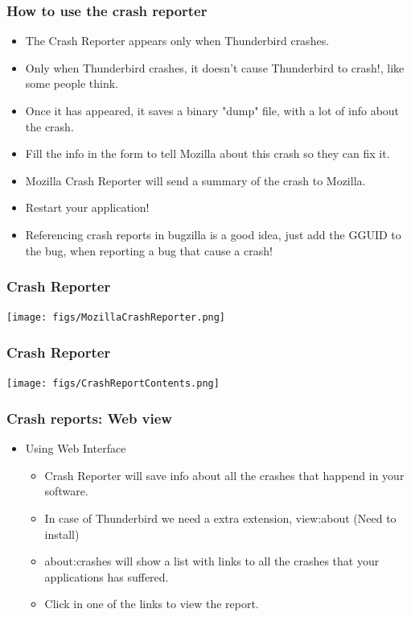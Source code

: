 \documentclass{beamer}
\begin{document}
\begin{frame}
 \frametitle{How to use the crash reporter}
 \begin{itemize}
  \item The Crash Reporter appears only when Thunderbird crashes.
  \item Only when Thunderbird crashes, it doesn't cause Thunderbird to crash!, like some people think.
  \item Once it has appeared, it saves a binary "dump" file, with a lot of info about the crash.
  \item Fill the info in the form to tell Mozilla about this crash so they can fix it.
  \item Mozilla Crash Reporter will send a summary of the crash to Mozilla.
  \item Restart your application!
  \item Referencing crash reports in bugzilla is a good idea, just add the GGUID to the bug, when reporting a bug that cause a crash!
 \end{itemize}
\end{frame}


\begin{frame}
\frametitle{Crash Reporter}
\begin{center}
 \texttt{[image: figs/MozillaCrashReporter.png]}
\begin{figure}
\end{figure}
\end{center}
\end{frame}


\begin{frame}
\frametitle{Crash Reporter}
\begin{center}
 \texttt{[image: figs/CrashReportContents.png]}
\begin{figure}
\end{figure}
\end{center}
\end{frame}


\begin{frame}
\frametitle{Crash reports: Web view}
 \begin{itemize}
  \item Using Web Interface
     \begin{itemize}
       \item Crash Reporter will save info about all the crashes that happend in your software.
       \item In case of Thunderbird we need a extra extension, view:about (Need to install)
       \item about:crashes will show a list with links to all the crashes that your applications has suffered.
       \item Click in one of the links to view the report.
     \end{itemize}
 \end{itemize}
\end{frame}
\end{document}
